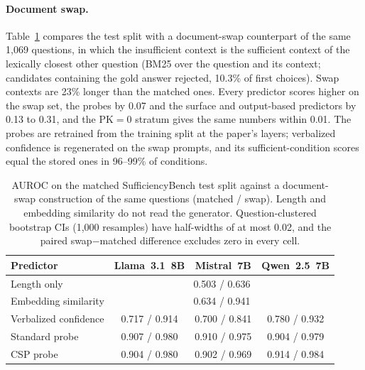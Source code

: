 \documentclass[acmsmall,screen,review]{acmart}
\newcommand{\bench}{SufficiencyBench}
\begin{document}
\paragraph{Document swap.} Table~\ref{tab:docswap} compares the test split with a document-swap counterpart of the same 1,069 questions, in which the insufficient context is the sufficient context of the lexically closest other question (BM25 over the question and its context; candidates containing the gold answer rejected, 10.3\% of first choices). Swap contexts are 23\% longer than the matched ones. Every predictor scores higher on the swap set, the probes by 0.07 and the surface and output-based predictors by 0.13 to 0.31, and the PK$=$0 stratum gives the same numbers within 0.01. The probes are retrained from the training split at the paper's layers; verbalized confidence is regenerated on the swap prompts, and its sufficient-condition scores equal the stored ones in 96--99\% of conditions.

\begin{table}[t]
\caption{AUROC on the matched \bench{} test split against a document-swap construction of the same questions (matched / swap). Length and embedding similarity do not read the generator. Question-clustered bootstrap CIs (1,000 resamples) have half-widths of at most 0.02, and the paired swap$-$matched difference excludes zero in every cell.}
\label{tab:docswap}
\small
\begin{tabular}{lccc}
\toprule
Predictor & Llama~3.1~8B & Mistral~7B & Qwen~2.5~7B \\
\midrule
Length only & \multicolumn{3}{c}{0.503 / 0.636} \\
Embedding similarity & \multicolumn{3}{c}{0.634 / 0.941} \\
Verbalized confidence & 0.717 / 0.914 & 0.700 / 0.841 & 0.780 / 0.932 \\
Standard probe & 0.907 / 0.980 & 0.910 / 0.975 & 0.904 / 0.979 \\
CSP probe & 0.904 / 0.980 & 0.902 / 0.969 & 0.914 / 0.984 \\
\bottomrule
\end{tabular}
\end{table}
\end{document}
